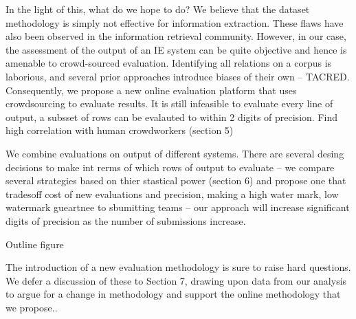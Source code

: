 In the light of this, what do we hope to do?
We believe that the dataset methodology is simply not effective for information extraction. 
These flaws have also been observed in the information retrieval community. 
However, in our case, the assessment of the output of an IE system can be quite objective and hence is amenable to crowd-sourced evaluation.
Identifying all relations on a corpus is laborious, and several prior approaches introduce biases of their own -- TACRED.
Consequently, we propose a new online evaluation platform that uses crowdsourcing to evaluate results. 
It is still infeasible to evaluate every line of output, a subsset of rows can be evalauted to within 2 digits of precision.
Find high correlation with human crowdworkers (section 5)

We combine evaluations on output of different systems. There are several desing decisions to make int rerms of which rows of output to evaluate -- we compare several strategies based on thier stastical power (section 6) and propose one that tradesoff cost of new evaluations and precision, making a high water mark, low watermark gueartnee to sbumitting teams -- our approach will increase significant digits of precision as the number of submissions increase.

Outline figure

The introduction of a new evaluation methodology is sure to raise hard questions. We defer a discussion of these to Section 7, drawing upon data from our analysis to argue for a change in methodology and support the online methodology that we propose..\cite{chaganty2016perspectives}

